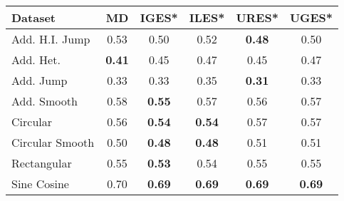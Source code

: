 \begin{tabular}{lccccc}
\toprule
Dataset & MD & IGES* & ILES* & URES* & UGES* \\
\midrule
Add. H.I. Jump & 0.53 & 0.50 & 0.52 & \textbf{0.48} & 0.50 \\
Add. Het. & \textbf{0.41} & 0.45 & 0.47 & 0.45 & 0.47 \\
Add. Jump & 0.33 & 0.33 & 0.35 & \textbf{0.31} & 0.33 \\
Add. Smooth & 0.58 & \textbf{0.55} & 0.57 & 0.56 & 0.57 \\
Circular & 0.56 & \textbf{0.54} & \textbf{0.54} & 0.57 & 0.57 \\
Circular Smooth & 0.50 & \textbf{0.48} & \textbf{0.48} & 0.51 & 0.51 \\
Rectangular & 0.55 & \textbf{0.53} & 0.54 & 0.55 & 0.55 \\
Sine Cosine & 0.70 & \textbf{0.69} & \textbf{0.69} & \textbf{0.69} & \textbf{0.69} \\
\bottomrule
\end{tabular}